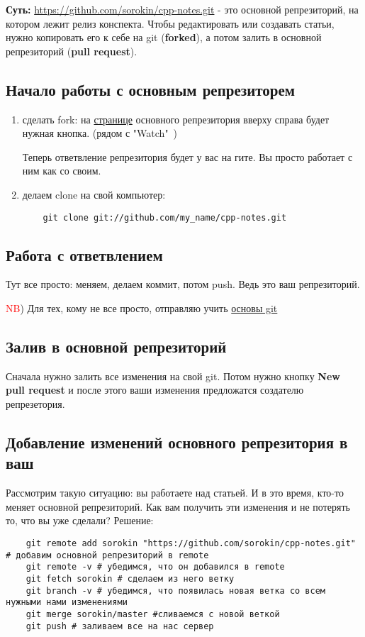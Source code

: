 \documentclass[12pt]{article}
\begin{document}
{\bf Суть:} \url{https://github.com/sorokin/cpp-notes.git} - это основной репрезиторий, на котором лежит релиз конспекта. Чтобы редактировать или создавать статьи, нужно копировать его к себе на git ({\bf forked}), а потом залить в основной репрезиторий ({\bf pull request}).
	\subsection{Начало работы с основным репрезиторем}
	\begin{enumerate}
	\item сделать fork: на \href{https://github.com/sorokin/cpp-notes}{странице} основного репрезитория  вверху справа будет нужная кнопка. (рядом с "Watch"\ )


	Теперь ответвление репрезитория будет у вас на гите. Вы просто работает с ним как со своим.
	\item делаем clone на свой компьютер:
	\begin{verbatim}
	git clone git://github.com/my_name/cpp-notes.git
	\end{verbatim}
	\end{enumerate}
	\subsection{Работа с ответвлением}
	 Тут все просто: меняем, делаем коммит, потом push. Ведь это ваш репрезиторий.


	\textcolor{red}{NB}) Для тех, кому не все просто, отправляю учить \href{https://git-scm.com/book/ru/v1}{основы git}
	\subsection{Залив в основной репрезиторий}
	Сначала нужно залить все изменения на свой git. Потом нужно кнопку \textbf{New pull request} и после этого ваши изменения предложатся создателю репрезетория.

	\subsection{Добавление изменений основного репрезитория в ваш}
	Рассмотрим такую ситуацию: вы работаете над статьей. И в это время, кто-то меняет основной репрезиторий. Как вам получить эти изменения и не потерять то, что вы уже сделали?
	Решение:
	\begin{verbatim}
	git remote add sorokin "https://github.com/sorokin/cpp-notes.git" # добавим основной репрезиторий в remote
	git remote -v # убедимся, что он добавился в remote
	git fetch sorokin # сделаем из него ветку
	git branch -v # убедимся, что появилась новая ветка со всем нужными нами изменениями
	git merge sorokin/master #сливаемся с новой веткой
	git push # заливаем все на нас сервер
	\end{verbatim}
\end{document}
